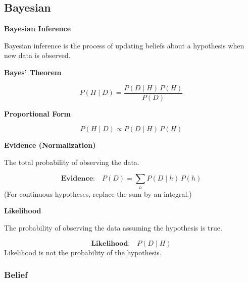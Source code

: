 \documentclass{book}
\begin{document}
\subsection{Bayesian}


{\Large\bfseries Bayesian Inference}\par
\medskip
Bayesian inference is the process of updating beliefs about a hypothesis when new data is observed.
    
    \bigskip
    {\bfseries Bayes' Theorem}\par
    \begin{equation*}
        P(H \mid D)
        =
        \frac{P(D \mid H)\,P(H)}{P(D)}
    \end{equation*}
    
    \bigskip
    {\bfseries Proportional Form}\par
    \begin{equation*}
        P(H \mid D) \propto P(D \mid H)\,P(H)
    \end{equation*}


\bigskip
    {\bfseries Evidence (Normalization)}\par
    The total probability of observing the data.\par
    \begin{equation*}
        \textbf{Evidence:}\quad
        P(D) = \sum_{h} P(D \mid h)\,P(h)
    \end{equation*}
    (For continuous hypotheses, replace the sum by an integral.)\par


\bigskip
    {\bfseries Likelihood}\par
    The probability of observing the data assuming the hypothesis is true.\par
    \begin{equation*}
        \textbf{Likelihood:}\quad P(D \mid H)
    \end{equation*}
    Likelihood is not the probability of the hypothesis.\par

\subsubsection{Belief}
\end{document}
